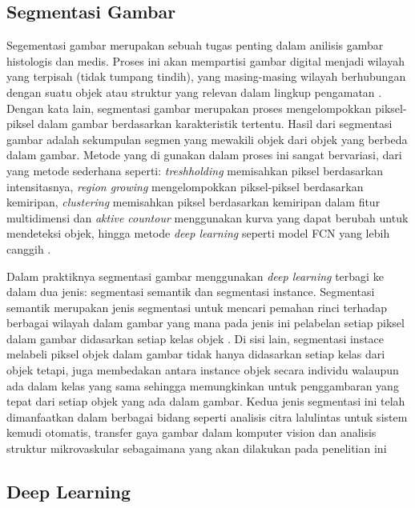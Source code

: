  
\subsection{Segmentasi Gambar}

\noindent Segementasi gambar merupakan sebuah tugas penting dalam anilisis gambar histologis dan medis. Proses ini akan mempartisi gambar digital menjadi wilayah yang terpisah (tidak tumpang tindih), yang masing-masing wilayah  berhubungan dengan suatu objek atau struktur yang relevan dalam lingkup pengamatan \cite{wu_image_2023}. Dengan kata lain, segmentasi gambar merupakan proses mengelompokkan piksel-piksel dalam gambar berdasarkan karakteristik tertentu. Hasil dari segmentasi gambar adalah sekumpulan segmen yang mewakili objek dari objek yang berbeda dalam gambar. Metode yang di gunakan dalam proses ini sangat bervariasi, dari yang metode sederhana seperti: \textit{treshholding} memisahkan piksel berdasarkan intensitasnya, \textit{region growing} mengelompokkan piksel-piksel berdasarkan kemiripan, \textit{clustering} memisahkan piksel berdasarkan kemiripan dalam fitur multidimensi dan \textit{aktive countour} menggunakan kurva yang dapat berubah untuk mendeteksi objek, hingga metode \textit{deep learning} seperti model FCN yang lebih canggih \cite{huang_fully_2022,wang_comprehensive_2022}.

\noindent Dalam praktiknya segmentasi gambar menggunakan \textit{deep learning} terbagi ke dalam dua jenis: segmentasi semantik dan segmentasi instance. Segmentasi semantik merupakan jenis segmentasi untuk mencari pemahan rinci terhadap berbagai wilayah dalam gambar yang mana pada jenis ini pelabelan setiap piksel dalam gambar didasarkan setiap kelas objek \cite{fan_image_2023}. Di sisi lain, segmentasi instace melabeli piksel objek dalam gambar tidak hanya didasarkan setiap kelas dari objek tetapi, juga membedakan antara instance objek  secara individu walaupun ada dalam kelas yang sama sehingga memungkinkan untuk penggambaran yang tepat dari setiap objek yang ada dalam gambar. Kedua jenis segmentasi ini telah dimanfaatkan dalam berbagai bidang seperti analisis citra lalulintas untuk sistem kemudi otomatis, transfer gaya gambar dalam komputer vision dan analisis struktur mikrovaskular sebagaimana yang akan dilakukan pada penelitian ini \cite{wang_traffic_2023, zhang_image_2023, sultan_microvasculature_2023}


\subsection{Deep Learning}

